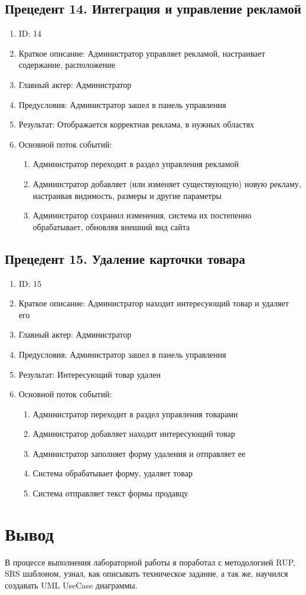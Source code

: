 \documentclass{article}
\begin{document}
\subsection{Прецедент 14. Интеграция и управление рекламой}
\begin{enumerate}
    \item ID: 14
    \item Краткое описание: Администратор  управляет рекламой, настраивает содержание, расположение
    \item Главный актер: Администратор
    \item Предусловия: Администратор зашел в панель управления 
    \item Результат: Отображается корректная реклама, в нужных областях
    \item Основной поток событий:
    \begin{enumerate}
        \item Администратор переходит в раздел управления рекламой
        \item Администратор добавляет (или изменяет существующую) новую рекламу, настраивая видимость, размеры и другие параметры
        \item Администратор сохранил изменения, система их постепенно обрабатывает, обновляя внешний вид сайта
    \end{enumerate}
\end{enumerate}

\subsection{Прецедент 15. Удаление карточки товара}
\begin{enumerate}
    \item ID: 15
    \item Краткое описание: Администратор находит интересующий товар и удаляет его
    \item Главный актер: Администратор
    \item Предусловия: Администратор зашел в панель управления 
    \item Результат: Интересующий товар удален
    \item Основной поток событий:
    \begin{enumerate}
        \item Администратор переходит в раздел управления товарами
        \item Администратор добавляет находит интересующий товар
        \item Администратор заполняет форму удаления и отправляет ее
        \item Система обрабатывает форму, удаляет товар
        \item Система отправляет текст формы продавцу
    \end{enumerate}
\end{enumerate}



\section{Вывод}

В процессе выполнения лабораторной работы я поработал с методологией RUP, SRS шаблоном, узнал, как описывать техническое задание, а так же, научился создавать UML UseCase диаграммы.
\end{document}
